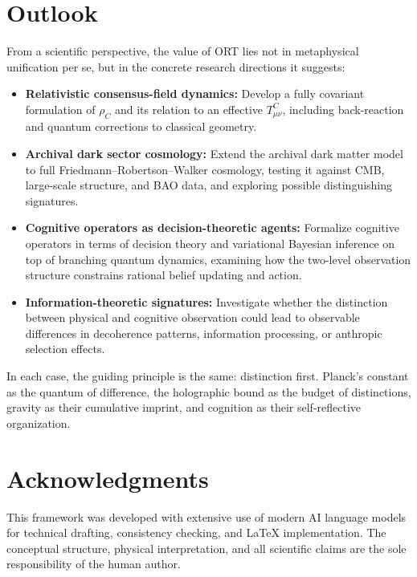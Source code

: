 \documentclass[12pt,a4paper]{article}
\begin{document}
\section{Outlook}
\label{sec:outlook}

From a scientific perspective, the value of ORT lies not in metaphysical unification per se, but in the concrete research directions it suggests:

\begin{itemize}
  \item \textbf{Relativistic consensus-field dynamics:} Develop a fully covariant formulation of $\rho_C$ and its relation to an effective $T^C_{\mu\nu}$, including back-reaction and quantum corrections to classical geometry.
  \item \textbf{Archival dark sector cosmology:} Extend the archival dark matter model to full Friedmann--Robertson--Walker cosmology, testing it against CMB, large-scale structure, and BAO data, and exploring possible distinguishing signatures.
  \item \textbf{Cognitive operators as decision-theoretic agents:} Formalize cognitive operators in terms of decision theory and variational Bayesian inference on top of branching quantum dynamics, examining how the two-level observation structure constrains rational belief updating and action.
  \item \textbf{Information-theoretic signatures:} Investigate whether the distinction between physical and cognitive observation could lead to observable differences in decoherence patterns, information processing, or anthropic selection effects.
\end{itemize}

In each case, the guiding principle is the same: distinction first. Planck's constant as the quantum of difference, the holographic bound as the budget of distinctions, gravity as their cumulative imprint, and cognition as their self-reflective organization.

\section*{Acknowledgments}

This framework was developed with extensive use of modern AI language models for technical drafting, consistency checking, and LaTeX implementation. The conceptual structure, physical interpretation, and all scientific claims are the sole responsibility of the human author.
\end{document}
